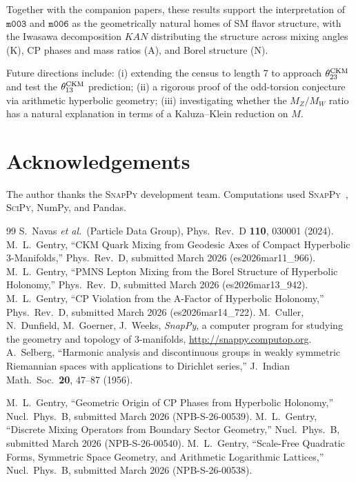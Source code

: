 \documentclass[preprint,12pt,number]{elsarticle}
\newcommand{\mfld}[1]{\texttt{#1}}
\begin{document}
Together with the companion papers, these results support the interpretation
of $\mfld{m003}$ and $\mfld{m006}$ as the geometrically natural homes of SM
flavor structure, with the Iwasawa decomposition $KAN$ distributing the
structure across mixing angles (K), CP phases and mass ratios (A), and
Borel structure (N).

Future directions include: (i) extending the census to length 7 to approach
$\theta_{23}^{\rm CKM}$ and test the $\theta_{13}^{\rm CKM}$ prediction;
(ii) a rigorous proof of the odd-torsion conjecture via arithmetic hyperbolic
geometry; (iii) investigating whether the $M_Z/M_W$ ratio has a natural
explanation in terms of a Kaluza--Klein reduction on $M$.

\section*{Acknowledgements}
The author thanks the \textsc{SnapPy} development team.
Computations used \textsc{SnapPy}~\cite{SnapPy}, \textsc{SciPy}, NumPy,
and Pandas.

\begin{thebibliography}{99}
  S.~Navas \textit{et al.}\ (Particle Data Group),
  Phys.\ Rev.\ D \textbf{110}, 030001 (2024).
  M.~L.~Gentry,
  ``CKM Quark Mixing from Geodesic Axes of Compact Hyperbolic 3-Manifolds,''
  Phys.\ Rev.\ D, submitted March 2026 (es2026mar11\_966).
  M.~L.~Gentry,
  ``PMNS Lepton Mixing from the Borel Structure of Hyperbolic Holonomy,''
  Phys.\ Rev.\ D, submitted March 2026 (es2026mar13\_942).
  M.~L.~Gentry,
  ``CP Violation from the A-Factor of Hyperbolic Holonomy,''
  Phys.\ Rev.\ D, submitted March 2026 (es2026mar14\_722).
  M.~Culler, N.~Dunfield, M.~Goerner, J.~Weeks,
  \textit{SnapPy}, a computer program for studying the geometry and topology
  of 3-manifolds, \url{http://snappy.computop.org}.
  A.~Selberg,
  ``Harmonic analysis and discontinuous groups in weakly symmetric Riemannian
  spaces with applications to Dirichlet series,''
  J.\ Indian Math.\ Soc.\ \textbf{20}, 47--87 (1956).

  M.~L.~Gentry,
  ``Geometric Origin of CP Phases from Hyperbolic Holonomy,''
  Nucl.\ Phys.\ B, submitted March 2026 (NPB-S-26-00539).
  M.~L.~Gentry,
  ``Discrete Mixing Operators from Boundary Sector Geometry,''
  Nucl.\ Phys.\ B, submitted March 2026 (NPB-S-26-00540).
  M.~L.~Gentry,
  ``Scale-Free Quadratic Forms, Symmetric Space Geometry, and Arithmetic
  Logarithmic Lattices,''
  Nucl.\ Phys.\ B, submitted March 2026 (NPB-S-26-00538).
\end{thebibliography}
\end{document}
